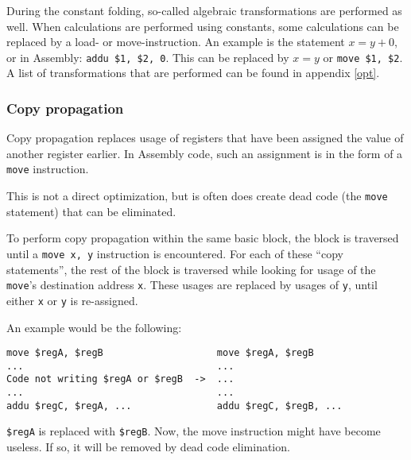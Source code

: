 \documentclass[10pt,a4paper]{article}
\begin{document}
During the constant folding, so-called algebraic transformations are performed
as well. When calculations are performed using constants, some calculations can
be replaced by a load- or move-instruction. An example is the statement
$x = y + 0$, or in Assembly: \texttt{addu \$1, \$2, 0}. This can be replaced by
$x = y$ or \texttt{move \$1, \$2}. A list of transformations that are performed
can be found in appendix \ref{opt}.

\subsubsection{Copy propagation}

Copy propagation replaces usage of registers that have been assigned the value
of another register earlier. In Assembly code, such an assignment is in the
form of a \texttt{move} instruction.

This is not a direct optimization, but is often does create dead code (the
\texttt{move} statement) that can be eliminated.

To perform copy propagation within the same basic block, the block is traversed
until a \texttt{move x, y} instruction is encountered. For each of these ``copy
statements'', the rest of the block is traversed while looking for usage of the
\texttt{move}'s destination address \texttt{x}. These usages are replaced by
usages of \texttt{y}, until either \texttt{x} or \texttt{y} is re-assigned.

%
%
%
%

An example would be the following:
\begin{verbatim}
move $regA, $regB                    move $regA, $regB
...                                  ...
Code not writing $regA or $regB  ->  ...
...                                  ...
addu $regC, $regA, ...               addu $regC, $regB, ...
\end{verbatim}
\texttt{\$regA} is replaced with \texttt{\$regB}. Now, the move instruction
might have become useless. If so, it will be removed by dead code elimination.
\end{document}
